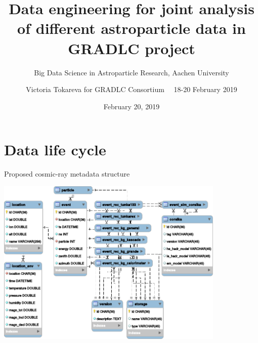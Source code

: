 \documentclass[18pt]{beamer}
\title[Data engineering for astroparticle physics]{Data engineering for joint analysis of different astroparticle data in GRADLC project}
\subtitle{Big Data Science in Astroparticle Research, Aachen University}
\author[Victoria Tokareva]{
  Victoria Tokareva for GRADLC Consortium ~\textbar~18-20 February 2019
}
\institute{Institute for Nuclear Physics (IKP)}
\date{February 20, 2019}
\newcommand{\insimg}[1]{
\begin{tikzpicture}[remember picture,overlay]
  \node[xshift=-7.7ex,yshift=12ex] at (current page.south east){%
    \texttt{[image: pics/\#1]}
  };
\end{tikzpicture}
}
\begin{document}



\section{Data life cycle}


%

\begin{frame}{Proposed cosmic-ray metadata structure}
\vspace{-1.5em}
\begin{center}
\includegraphics[width=0.82\textwidth]{pics/metadata.pdf}
\end{center}
\end{frame}
\end{document}

